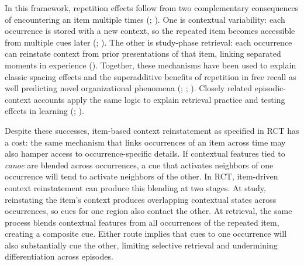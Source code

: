 \documentclass[
  man,
  floatsintext,
  longtable,
  nolmodern,
  notxfonts,
  notimes,
  draftfirst,
  colorlinks=true,linkcolor=blue,citecolor=blue,urlcolor=blue]{apa7}
\begin{document}
In this framework, repetition effects follow from two complementary
consequences of encountering an item multiple times
(;
). One is
contextual variability: each occurrence is stored with a new context, so
the repeated item becomes accessible from multiple cues later
(;
). The other is
study-phase retrieval: each occurrence can reinstate context from prior
presentations of that item, linking separated moments in experience
(). Together,
these mechanisms have been used to explain classic spacing effects and
the superadditive benefits of repetition in free recall as well
predicting novel organizational phenomena
(;
;
). Closely
related episodic-context accounts apply the same logic to explain
retrieval practice and testing effects in learning
(;
).

Despite these successes, item-based context reinstatement as specified
in RCT has a cost: the same mechanism that links occurrences of an item
across time may also hamper access to occurrence-specific details. If
contextual features tied to \emph{canoe} are blended across occurrences,
a cue that activates neighbors of one occurrence will tend to activate
neighbors of the other. In RCT, item-driven context reinstatement can
produce this blending at two stages. At study, reinstating the item's
context produces overlapping contextual states across occurrences, so
cues for one region also contact the other. At retrieval, the same
process blends contextual features from all occurrences of the repeated
item, creating a composite cue. Either route implies that cues to one
occurrence will also substantially cue the other, limiting selective
retrieval and undermining differentiation across episodes.
\end{document}
